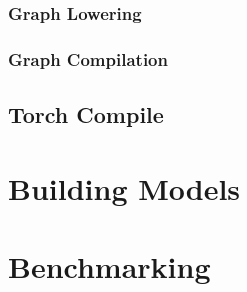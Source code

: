   \subsubsection*{Graph Lowering}
  \subsubsection*{Graph Compilation}
    \label{subsubsec:torchinductor}
    \label{subsubsec:torchinductor}

\subsection*{Torch Compile}\label{subsec:torch_compile}
\section*{Building Models}\label{sec:building_models}
    \subsection{}\label{subsec:torchinductor}
      

\section{Benchmarking}\label{sec:benchmarking}



